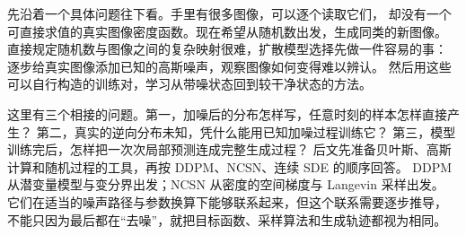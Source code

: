 先沿着一个具体问题往下看。手里有很多图像，可以逐个读取它们，
却没有一个可直接求值的真实图像密度函数。现在希望从随机数出发，生成同类的新图像。
直接规定随机数与图像之间的复杂映射很难，扩散模型选择先做一件容易的事：
逐步给真实图像添加已知的高斯噪声，观察图像如何变得难以辨认。
然后用这些可以自行构造的训练对，学习从带噪状态回到较干净状态的方法。

这里有三个相接的问题。第一，加噪后的分布怎样写，任意时刻的样本怎样直接产生？
第二，真实的逆向分布未知，凭什么能用已知加噪过程训练它？
第三，模型训练完后，怎样把一次次局部预测连成完整生成过程？
后文先准备贝叶斯、高斯计算和随机过程的工具，再按 DDPM、NCSN、连续 SDE 的顺序回答。
DDPM 从潜变量模型与变分界出发；NCSN 从密度的空间梯度与 Langevin 采样出发。
它们在适当的噪声路径与参数换算下能够联系起来，但这个联系需要逐步推导，
不能只因为最后都在“去噪”，就把目标函数、采样算法和生成轨迹都视为相同。
